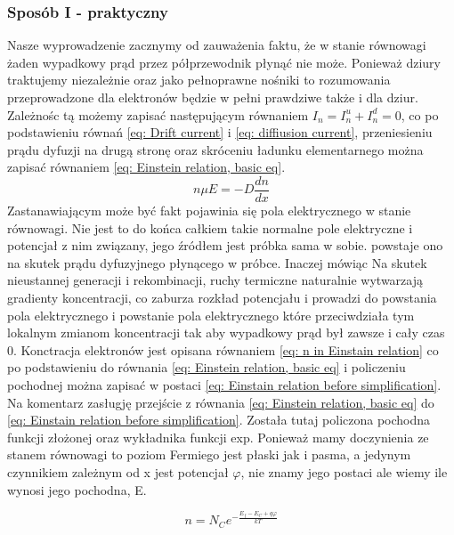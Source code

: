         \subsubsection{Sposób I - praktyczny}
            Nasze wyprowadzenie zacznymy od zauważenia faktu, że w stanie równowagi żaden wypadkowy prąd przez półprzewodnik płynąć nie może. Ponieważ dziury traktujemy niezależnie oraz jako pełnoprawne nośniki to rozumowania przeprowadzone dla elektronów będzie w pełni prawdziwe także i dla dziur. Zależnośc tą możemy zapisać następującym równaniem $I_n = I_n^u + I_n^d = 0$, co po podstawieniu równań \ref{eq: Drift current} i \ref{eq: diffiusion current}, przeniesieniu prądu dyfuzji na drugą stronę oraz skróceniu ładunku elementarnego można zapisać równaniem \ref{eq: Einstein relation, basic eq}.
            \begin{equation}
                n\mu E = - D\frac{dn}{dx} \label{eq: Einstein relation, basic eq}
            \end{equation}
            Zastanawiającym może być fakt pojawinia się pola elektrycznego w stanie równowagi. Nie jest to do końca całkiem takie normalne pole elektryczne i potencjał z nim związany, jego źródłem jest próbka sama w sobie. powstaje ono na skutek prądu dyfuzyjnego płynącego w próbce. Inaczej mówiąc Na skutek nieustannej generacji i rekombinacji, ruchy termiczne naturalnie wytwarzają gradienty koncentracji, co zaburza rozkład potencjału i prowadzi do powstania pola elektrycznego i powstanie pola elektrycznego które przeciwdziała tym lokalnym zmianom koncentracji tak aby wypadkowy prąd był zawsze i cały czas 0. 
            \newline \newline
            \noindent Konctracja elektronów jest opisana równaniem \ref{eq: n in Einstain relation} co po podstawieniu do równania \ref{eq: Einstein relation, basic eq} i policzeniu pochodnej można zapisać w postaci \ref{eq: Einstain relation before simplification}. Na komentarz zasługję przejście z równania \ref{eq: Einstein relation, basic eq} do \ref{eq: Einstain relation before simplification}. Została tutaj policzona pochodna funkcji złożonej oraz wykładnika funkcji exp. Ponieważ mamy doczynienia ze stanem równowagi to poziom Fermiego jest płaski jak i pasma, a jedynym czynnikiem zależnym od x jest potencjał $\varphi$, nie znamy jego postaci ale wiemy ile wynosi jego pochodna, E.  
            \newline
            \begin{minipage}[l]{0.49\textwidth}
                \begin{equation}
                    n = N_C e^{-\frac{E_f - E_C + q\varphi }{kT}} \label{eq: n in Einstain relation}
                \end{equation}
            \end{minipage}

